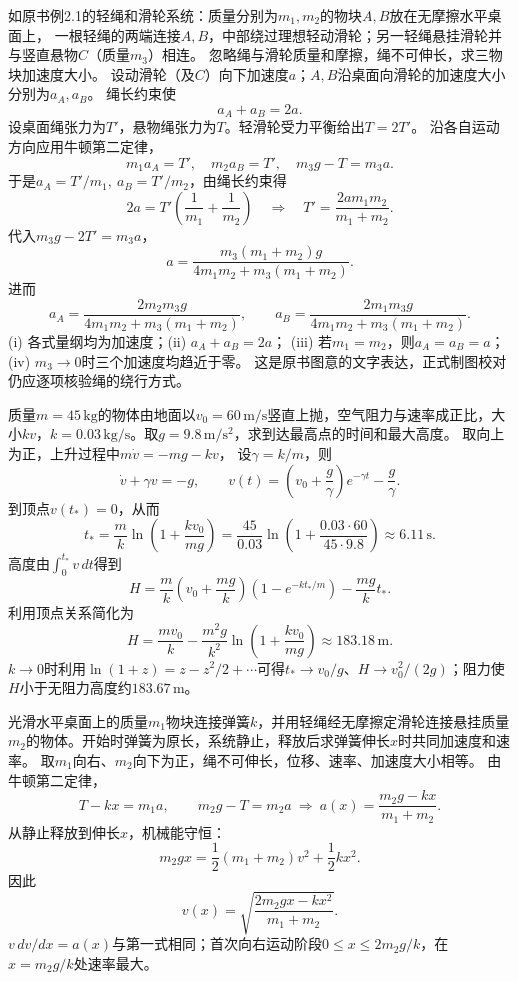 
\problemtext 如原书例2.1的轻绳和滑轮系统：质量分别为$m_1,m_2$的物块$A,B$放在无摩擦水平桌面上，
一根轻绳的两端连接$A,B$，中部绕过理想轻动滑轮；另一轻绳悬挂滑轮并与竖直悬物$C$（质量$m_3$）相连。
忽略绳与滑轮质量和摩擦，绳不可伸长，求三物块加速度大小。
\workings
设动滑轮（及$C$）向下加速度$a$；$A,B$沿桌面向滑轮的加速度大小分别为$a_A,a_B$。
绳长约束使
\[
a_A+a_B=2a.
\]
设桌面绳张力为$T'$，悬物绳张力为$T$。轻滑轮受力平衡给出$T=2T'$。
沿各自运动方向应用牛顿第二定律，
\[
m_1a_A=T',\quad m_2a_B=T',\quad m_3g-T=m_3a.
\]
于是$a_A=T'/m_1,\ a_B=T'/m_2$，由绳长约束得
\[
2a=T'\left(\frac1{m_1}+\frac1{m_2}\right)
\quad\Longrightarrow\quad
T'=\frac{2am_1m_2}{m_1+m_2}.
\]
代入$m_3g-2T'=m_3a$，
\[
\boxed{
a=\frac{m_3(m_1+m_2)g}{4m_1m_2+m_3(m_1+m_2)}
}.
\]
进而
\[
\boxed{
a_A=\frac{2m_2m_3g}{4m_1m_2+m_3(m_1+m_2)},\qquad
a_B=\frac{2m_1m_3g}{4m_1m_2+m_3(m_1+m_2)}.
}
\]
\crosscheck (i) 各式量纲均为加速度；(ii) $a_A+a_B=2a$；
(iii) 若$m_1=m_2$，则$a_A=a_B=a$；
(iv) $m_3\to0$时三个加速度均趋近于零。
这是原书图意的文字表达，正式制图校对仍应逐项核验绳的绕行方式。



\problemtext 质量$m=45\,\mathrm{kg}$的物体由地面以$v_0=60\,\mathrm{m/s}$竖直上抛，空气阻力与速率成正比，大小$kv$，$k=0.03\,\mathrm{kg/s}$。取$g=9.8\,\mathrm{m/s^2}$，求到达最高点的时间和最大高度。
\workings
取向上为正，上升过程中$m\dot v=-mg-kv$，
设$\gamma=k/m$，则
\[
\dot v+\gamma v=-g,\qquad
v(t)=\left(v_0+\frac g\gamma\right)e^{-\gamma t}-\frac g\gamma.
\]
到顶点$v(t_*)=0$，从而
\[
\boxed{t_*=\frac{m}{k}\ln\left(1+\frac{kv_0}{mg}\right)
=\frac{45}{0.03}\ln\left(1+\frac{0.03\cdot60}{45\cdot9.8}\right)
\approx6.11\,\mathrm s}.
\]
高度由$\int_0^{t_*}v\,dt$得到
\[
H=\frac{m}{k}\left(v_0+\frac{mg}{k}\right)
       (1-e^{-kt_*/m})-\frac{mg}{k}t_*.
\]
利用顶点关系简化为
\[
\boxed{H=\frac{mv_0}{k}-\frac{m^2g}{k^2}
        \ln\left(1+\frac{kv_0}{mg}\right)
\approx 183.18\,\mathrm m}.
\]
\crosscheck $k\to0$时利用$\ln(1+z)=z-z^2/2+\cdots$可得$t_*\to v_0/g$、$H\to v_0^2/(2g)$；阻力使$H$小于无阻力高度约$183.67\,\mathrm m$。

\problemtext 光滑水平桌面上的质量$m_1$物块连接弹簧$k$，并用轻绳经无摩擦定滑轮连接悬挂质量$m_2$的物体。开始时弹簧为原长，系统静止，释放后求弹簧伸长$x$时共同加速度和速率。
\workings
取$m_1$向右、$m_2$向下为正，绳不可伸长，位移、速率、加速度大小相等。
由牛顿第二定律，
\[
 T-kx=m_1a,\qquad m_2g-T=m_2a
 \ \Longrightarrow\
 \boxed{a(x)=\frac{m_2g-kx}{m_1+m_2}}.
\]
从静止释放到伸长$x$，机械能守恒：
\[
m_2gx=\frac12(m_1+m_2)v^2+\frac12kx^2.
\]
因此
\[
\boxed{v(x)=\sqrt{\frac{2m_2gx-kx^2}{m_1+m_2}}}.
\]
\crosscheck $v\,dv/dx=a(x)$与第一式相同；首次向右运动阶段$0\le x\le2m_2g/k$，在$x=m_2g/k$处速率最大。

